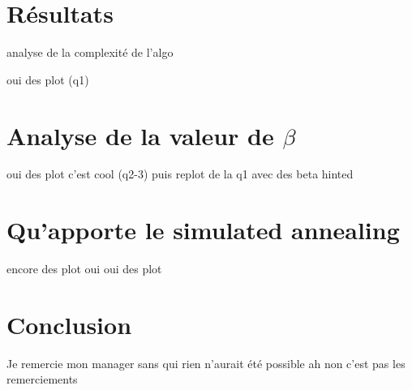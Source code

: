 \documentclass[twocolumn]{article}
\begin{document}
	\section{Résultats}
		analyse de la complexité de l'algo
		
		oui des plot (q1)
	\section{Analyse de la valeur de $\beta$}
		oui des plot c'est cool (q2-3)
		puis replot de la q1 avec des beta hinted
	\section{Qu'apporte le simulated annealing}
		encore des plot oui oui des plot
		
	\section{Conclusion}
		Je remercie mon manager sans qui rien n'aurait été possible ah non c'est pas les remerciements
\end{document}
